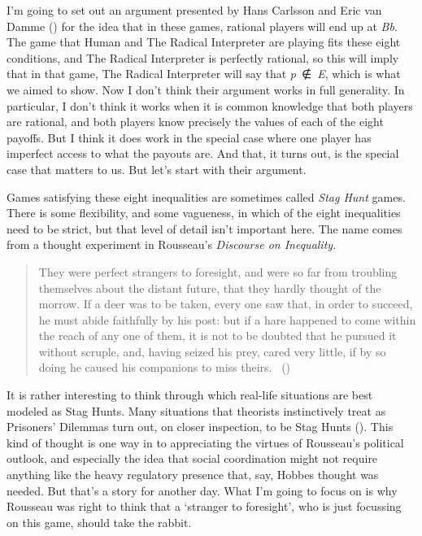 \documentclass[
  12pt,
  letterpaper,
]{scrbook}
\begin{document}
I'm going to set out an argument presented by Hans Carlsson and Eric van
Damme () for the idea that in
these games, rational players will end up at \emph{Bb}. The game that
Human and The Radical Interpreter are playing fits these eight
conditions, and The Radical Interpreter is perfectly rational, so this
will imply that in that game, The Radical Interpreter will say that
\emph{p}~∉~\emph{E}, which is what we aimed to show. Now I don't think
their argument works in full generality. In particular, I don't think it
works when it is common knowledge that both players are rational, and
both players know precisely the values of each of the eight payoffs. But
I think it does work in the special case where one player has imperfect
access to what the payouts are. And that, it turns out, is the special
case that matters to us. But let's start with their argument.

Games satisfying these eight inequalities are sometimes called
\emph{Stag Hunt} games. There is some flexibility, and some vagueness,
in which of the eight inequalities need to be strict, but that level of
detail isn't important here. The name comes from a thought experiment in
Rousseau's \emph{Discourse on Inequality}.

\begin{quote}
They were perfect strangers to foresight, and were so far from troubling
themselves about the distant future, that they hardly thought of the
morrow. If a deer was to be taken, every one saw that, in order to
succeed, he must abide faithfully by his post: but if a hare happened to
come within the reach of any one of them, it is not to be doubted that
he pursued it without scruple, and, having seized his prey, cared very
little, if by so doing he caused his companions to miss theirs.
~()
\end{quote}

It is rather interesting to think through which real-life situations are
best modeled as Stag Hunts. Many situations that theorists instinctively
treat as Prisoners' Dilemmas turn out, on closer inspection, to be Stag
Hunts (). This kind of thought is
one way in to appreciating the virtues of Rousseau's political outlook,
and especially the idea that social coordination might not require
anything like the heavy regulatory presence that, say, Hobbes thought
was needed. But that's a story for another day. What I'm going to focus
on is why Rousseau was right to think that a `stranger to foresight',
who is just focussing on this game, should take the rabbit.
\end{document}
